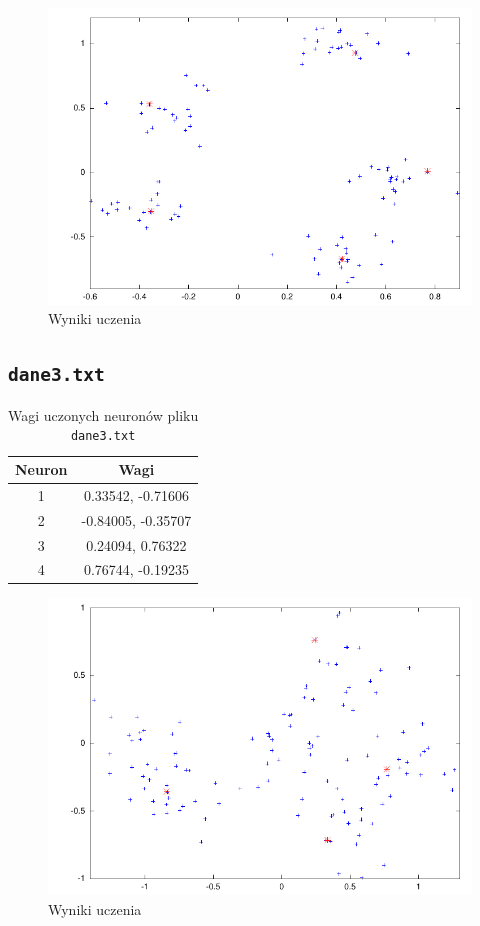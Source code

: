 \documentclass[pointlessnumbers, abstracton, headsepline, a4paper]{scrartcl}
\begin{document}
\begin{figure}[!h]
\centering
\includegraphics[scale=1.0]{src/mydane2.pdf}\caption{\label{fig:dane1}Wyniki uczenia}
\end{figure}

\clearpage
\subsection{\texttt{dane3.txt}}

\begin{table}[h]
\centering
\begin{tabular}[t]{c|c}
Neuron & Wagi \\
\hline
1&   0.33542,  -0.71606 \\
2&  -0.84005,  -0.35707 \\
3&   0.24094,   0.76322 \\
4&   0.76744,  -0.19235 \\
\end{tabular}
\caption{\label{tab:xor}Wagi uczonych neuronów pliku \texttt{dane3.txt}}
\end{table}

\begin{figure}[!h]
\centering
\includegraphics[scale=1.0]{src/mydane3.pdf}\caption{\label{fig:dane1}Wyniki uczenia}
\end{figure}
\end{document}
